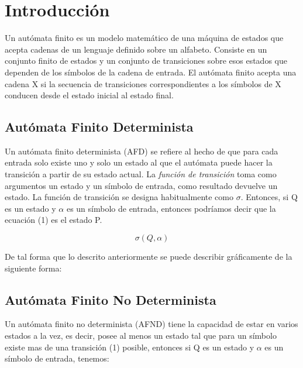 \section{Introducción}

Un autómata finito es un modelo matemático de una máquina de estados que acepta cadenas de un lenguaje definido sobre un alfabeto. Consiste en un conjunto finito de estados y un conjunto de transiciones sobre esos estados que dependen de los símbolos de la cadena de entrada. El autómata finito acepta una cadena X si la secuencia de transiciones correspondientes a los símbolos de X conducen desde el estado inicial al estado final.

\subsection{Autómata Finito Determinista}

Un autómata finito determinista (AFD) se refiere al hecho de que para cada entrada solo existe uno y solo un estado al que el autómata puede hacer la transición a partir de su estado actual. La \textit{función de transición} toma como argumentos un estado y un símbolo de entrada, como resultado devuelve un estado. La función de transición se designa habitualmente como $\sigma$. Entonces, si Q es un estado y $\alpha$ es un símbolo de entrada, entonces podríamos decir que la ecuación (1) es el estado P.

\begin{equation}
\sigma(Q, \alpha)
\end{equation}

De tal forma que lo descrito anteriormente se puede describir gráficamente de la siguiente forma:

\begin{center}
\end{center}

\subsection{Autómata Finito No Determinista}

Un autómata finito no determinista (AFND) tiene la capacidad de estar en varios estados a la vez, es decir, posee al menos un estado tal que para un símbolo existe mas de una transición (1) posible, entonces si Q es un estado y $\alpha$ es un símbolo de entrada, tenemos:

\begin{center}
\end{center}

\pagebreak